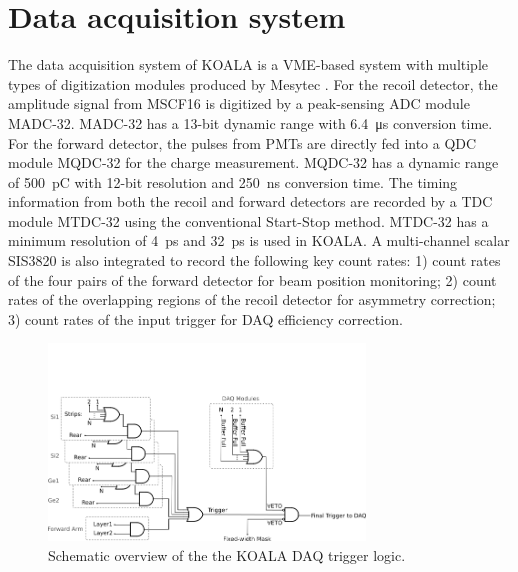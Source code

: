 \documentclass[number,5p]{elsarticle}
\begin{document}
\section{Data acquisition system}
\label{sec:daq}

The data acquisition system of KOALA is a VME-based system with multiple types
of digitization modules produced by Mesytec \cite{mesytec}.
For the recoil detector, the amplitude signal from MSCF16 is digitized by a
peak-sensing ADC module MADC-32.
MADC-32 has a 13-bit dynamic range with \SI{6.4}{\micro\second} conversion time.
For the forward detector, the pulses from PMTs are directly fed into a QDC
module MQDC-32 for the charge measurement.
MQDC-32 has a dynamic range of \SI{500}{\pico\coulomb} with 12-bit resolution
and \SI{250}{\nano\second} conversion time.
The timing information from both the recoil and forward detectors are recorded by a TDC module MTDC-32 using the conventional Start-Stop method.
MTDC-32 has a minimum resolution of \SI{4}{\pico\second} and
\SI{32}{\pico\second} is used in KOALA.
A multi-channel scalar SIS3820 \cite{sis} is also integrated to record
the following key count rates: 1) count rates of the four pairs of the forward detector for beam position monitoring; 2) count rates of the overlapping regions of the recoil detector for asymmetry correction; 3) count rates of the input trigger for DAQ efficiency correction.

\begin{figure}[tb!]
  \centering
  \includegraphics[width=0.75\textwidth]{./trigger_logic.png}
  \caption{Schematic overview of the the KOALA DAQ trigger logic.}
  \label{fig:trigger_logic}
\end{figure}
\end{document}
